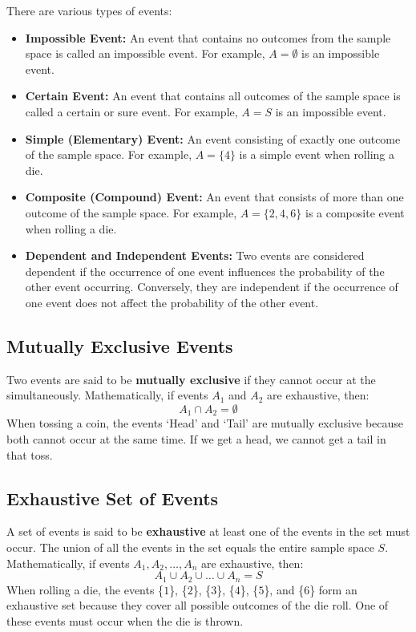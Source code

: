 \documentclass[twoside]{book}
\begin{document}
There are various types of events:
\begin{itemize}
    \item \textbf{Impossible Event:}  
    An event that contains no outcomes from the sample space is called an impossible event. For example, $A = \emptyset$ is an impossible event.

    \item \textbf{Certain Event:}  
    An event that contains all outcomes of the sample space is called a certain or sure event. For example, $A = S$ is an impossible event.

    \item \textbf{Simple (Elementary) Event:}  
    An event consisting of exactly one outcome of the sample space. For example, $A = \{4\}$ is a simple event when rolling a die.

    \item \textbf{Composite (Compound) Event:}  
    An event that consists of more than one outcome of the sample space. For example, $A = \{2, 4, 6\}$ is a composite event when rolling a die.

    \item \textbf{Dependent and Independent Events:}  
    Two events are considered dependent if the occurrence of one event influences the probability of the other event occurring. Conversely, they are independent if the occurrence of one event does not affect the probability of the other event.
\end{itemize}

    \subsection{Mutually Exclusive Events}
    Two events are said to be \textbf{mutually exclusive} if they cannot occur at the simultaneously. Mathematically, if events $A_1$ and $A_2$ are exhaustive, then:
    \[
    A_1 \cap A_2 = \emptyset
    \]
    When tossing a coin, the events `Head' and `Tail' are mutually exclusive because both cannot occur at the same time. If we get a head, we cannot get a tail in that toss.
    
    \subsection{Exhaustive Set of Events}
    A set of events is said to be \textbf{exhaustive} at least one of the events in the set must occur. The union of all the events in the set equals the entire sample space $S$. Mathematically, if events $A_1, A_2, \dots, A_n$ are exhaustive, then:
    \[
    A_1 \cup A_2 \cup \dots \cup A_n = S
    \]
    When rolling a die, the events \{$1$\}, \{$2$\}, \{$3$\}, \{$4$\}, \{$5$\}, and \{$6$\} form an exhaustive set because they cover all possible outcomes of the die roll. One of these events must occur when the die is thrown.
\end{document}
